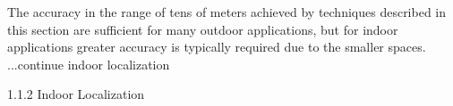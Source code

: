 
The accuracy in the range of tens of meters achieved by techniques described in this section are sufficient for many outdoor applications, but for indoor applications greater accuracy is typically required due to the smaller spaces. ...continue indoor localization


1.1.2 Indoor Localization

